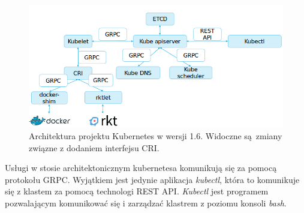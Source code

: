 \documentclass[10pt,a4paper,titlepage,twoside]{report}
\begin{document}
\begin{figure}[!h]
	\centering
	\includegraphics[scale=0.7]{pics/k8s_1_6.png}
	\caption{Architektura projektu Kubernetes w wersji 1.6. Widoczne są zmiany związne z dodaniem interfejsu CRI.}
	\label{k8s_1_6}
\end{figure}

Usługi w stosie architektonicznym kubernetesa komunikują się za pomocą protokołu GRPC. Wyjątkiem jest jedynie aplikacja \textit{kubectl}, która to komunikuje się z klastem za pomocą technologi REST API. \textit{Kubectl} jest programem pozwalającym komunikować się i zarządzać klastrem z poziomu konsoli \textit{bash}.
\end{document}
